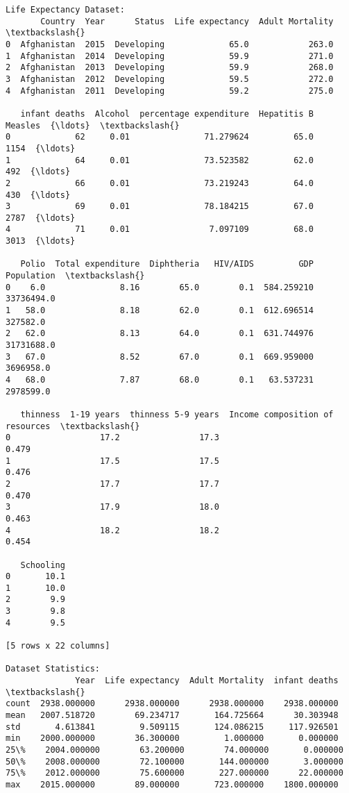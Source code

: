 \documentclass[11pt]{article}
\begin{document}
    \begin{Verbatim}[commandchars=\\\{\}]
Life Expectancy Dataset:
       Country  Year      Status  Life expectancy  Adult Mortality  \textbackslash{}
0  Afghanistan  2015  Developing             65.0            263.0
1  Afghanistan  2014  Developing             59.9            271.0
2  Afghanistan  2013  Developing             59.9            268.0
3  Afghanistan  2012  Developing             59.5            272.0
4  Afghanistan  2011  Developing             59.2            275.0

   infant deaths  Alcohol  percentage expenditure  Hepatitis B  Measles  {\ldots}  \textbackslash{}
0             62     0.01               71.279624         65.0     1154  {\ldots}
1             64     0.01               73.523582         62.0      492  {\ldots}
2             66     0.01               73.219243         64.0      430  {\ldots}
3             69     0.01               78.184215         67.0     2787  {\ldots}
4             71     0.01                7.097109         68.0     3013  {\ldots}

   Polio  Total expenditure  Diphtheria   HIV/AIDS         GDP  Population  \textbackslash{}
0    6.0               8.16        65.0        0.1  584.259210  33736494.0
1   58.0               8.18        62.0        0.1  612.696514    327582.0
2   62.0               8.13        64.0        0.1  631.744976  31731688.0
3   67.0               8.52        67.0        0.1  669.959000   3696958.0
4   68.0               7.87        68.0        0.1   63.537231   2978599.0

   thinness  1-19 years  thinness 5-9 years  Income composition of resources  \textbackslash{}
0                  17.2                17.3                            0.479
1                  17.5                17.5                            0.476
2                  17.7                17.7                            0.470
3                  17.9                18.0                            0.463
4                  18.2                18.2                            0.454

   Schooling
0       10.1
1       10.0
2        9.9
3        9.8
4        9.5

[5 rows x 22 columns]

Dataset Statistics:
              Year  Life expectancy  Adult Mortality  infant deaths  \textbackslash{}
count  2938.000000      2938.000000      2938.000000    2938.000000
mean   2007.518720        69.234717       164.725664      30.303948
std       4.613841         9.509115       124.086215     117.926501
min    2000.000000        36.300000         1.000000       0.000000
25\%    2004.000000        63.200000        74.000000       0.000000
50\%    2008.000000        72.100000       144.000000       3.000000
75\%    2012.000000        75.600000       227.000000      22.000000
max    2015.000000        89.000000       723.000000    1800.000000


\end{Verbatim}
\end{document}
